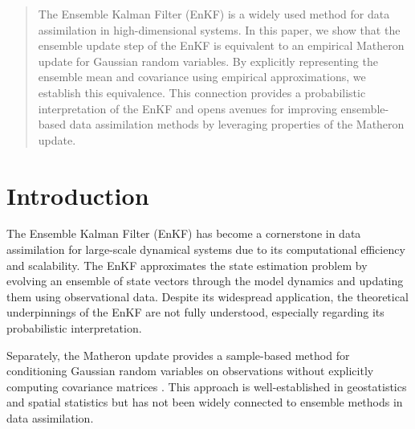\documentclass{article}
\theoremstyle{plain}
\begin{document}

\printAffiliationsAndNotice{}  %

\begin{abstract}
The Ensemble Kalman Filter (EnKF) is a widely used method for data assimilation in high-dimensional systems. In this paper, we show that the ensemble update step of the EnKF is equivalent to an empirical Matheron update for Gaussian random variables. By explicitly representing the ensemble mean and covariance using empirical approximations, we establish this equivalence. This connection provides a probabilistic interpretation of the EnKF and opens avenues for improving ensemble-based data assimilation methods by leveraging properties of the Matheron update.
\end{abstract}

\section{Introduction}
The Ensemble Kalman Filter (EnKF) \citep{Evensen2009Data} has become a cornerstone in data assimilation for large-scale dynamical systems due to its computational efficiency and scalability. The EnKF approximates the state estimation problem by evolving an ensemble of state vectors through the model dynamics and updating them using observational data. Despite its widespread application, the theoretical underpinnings of the EnKF are not fully understood, especially regarding its probabilistic interpretation.

Separately, the Matheron update provides a sample-based method for conditioning Gaussian random variables on observations without explicitly computing covariance matrices \citep{Doucet2010Note,Wilson2020Efficiently,Wilson2021Pathwise}. This approach is well-established in geostatistics and spatial statistics but has not been widely connected to ensemble methods in data assimilation.
\end{document}
